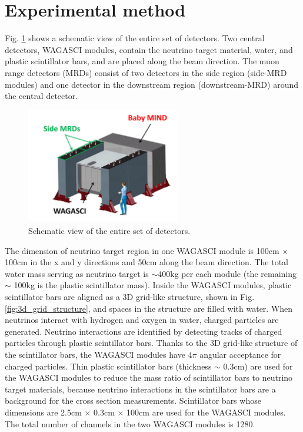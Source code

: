 \section{Experimental method}
Fig. \ref{fig:t59_detectors} shows a schematic view of the entire set of detectors.
Two central detectors, WAGASCI modules, contain the neutrino target material, water, and plastic scintillator bars,
and are placed along the beam direction.
The muon range detectors (MRDs) consist of two detectors in the side region (side-MRD modules)
and one detector in the downstream region (downstream-MRD) around the central detector.

\begin{figure}%
  \begin{center}
  \includegraphics[width=0.6\textwidth]{figs/t59_detectors.pdf}
  \caption{Schematic view of the entire set of detectors.}
  \label{fig:t59_detectors}
  \end{center}
\end{figure}


The dimension of neutrino target region in one WAGASCI module is 
100cm $\times$ 100cm in the x and y directions and 50cm along the beam direction.
The total water mass serving as neutrino target is $\sim$400kg per each module (the remaining $\sim$ 100kg is the plastic scintillator mass).
Inside the WAGASCI modules, plastic scintillator bars are aligned as a 3D grid-like structure,
shown in Fig. \ref{fig:3d_grid_structure}, and spaces in the structure are filled with water.
When neutrinos interact with hydrogen and oxygen in water, charged particles are generated.
Neutrino interactions are identified by detecting tracks of charged particles through plastic scintillator bars.
Thanks to the 3D grid-like structure of the scintillator bars,
the WAGASCI modules have $4\pi$ angular acceptance for charged particles.
Thin plastic scintillator bars (thickness $\sim$ 0.3cm) are used for the WAGASCI modules
to reduce the mass ratio of scintillator bars to neutrino target materials,
because neutrino interactions in the scintillator bars are a background for the cross section measurements.
Scintillator bars whose dimensions are 2.5cm $\times$ 0.3cm $\times$ 100cm are used for the WAGASCI modules.
The total number of channels in the two WAGASCI modules is 1280.


